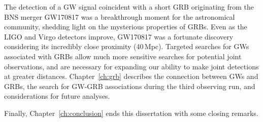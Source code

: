 The detection of a \ac{GW} signal coincident with a short \ac{GRB} originating from the \ac{BNS} merger GW170817 was a breakthrough moment for the astronomical community, shedding light on the mysterious properties of \acp{GRB}.
Even as the LIGO and Virgo detectors improve, GW170817 was a fortunate discovery considering its incredibly close proximity (40\,Mpc).
Targeted searches for \acp{GW} associated with \acp{GRB} allow much more sensitive searches for potential joint observations, and are necessary for expanding our ability to make joint detections at greater distances.
Chapter~\ref{ch:grb} describes the connection between \acp{GW} and \acp{GRB}, the search for GW-GRB associations during the third observing run, and considerations for future analyses.

Finally, Chapter~\ref{ch:conclusion} ends this dissertation with some closing remarks.
